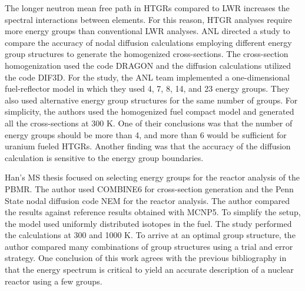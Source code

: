 
The longer neutron mean free path in \glspl{HTGR} compared to \gls{LWR} increases the spectral interactions between elements.
For this reason, \gls{HTGR} analyses require more energy groups than conventional \gls{LWR} analyses.
\gls{ANL} directed a study \cite{lee_status_2006} to compare the accuracy of nodal diffusion calculations employing different energy group structures to generate the homogenized cross-sections.
The cross-section homogenization used the code DRAGON and the diffusion calculations utilized the code DIF3D.
For the study, the ANL team implemented a one-dimensional fuel-reflector model in which they used 4, 7, 8, 14, and 23 energy groups.
They also used alternative energy group structures for the same number of groups.
For simplicity, the authors used the homogenized fuel compact model and generated all the cross-sections at 300 K.
One of their conclusions was that the number of energy groups should be more than 4, and more than 6 would be sufficient for uranium fueled \glspl{HTGR}.
Another finding was that the accuracy of the diffusion calculation is sensitive to the energy group boundaries.

Han's MS thesis \cite{han_sensitivity_2008} focused on selecting energy groups for the reactor analysis of the \gls{PBMR}.
The author used COMBINE6 \cite{grimesey_combinepc-portable_1994} for cross-section generation and the Penn State nodal diffusion code NEM \cite{bandini_three-dimensional_1990} for the reactor analysis.
The author compared the results against reference results obtained with MCNP5.
To simplify the setup, the model used uniformly distributed isotopes in the fuel.
The study performed the calculations at 300 and 1000 K.
To arrive at an optimal group structure, the author compared many combinations of group structures using a trial and error strategy.
One conclusion of this work agrees with the previous bibliography \cite{gulf_oil_company_nuclear_1973} \cite{duderstadt_nuclear_1976} in that the energy spectrum is critical to yield an accurate description of a nuclear reactor using a few groups.

